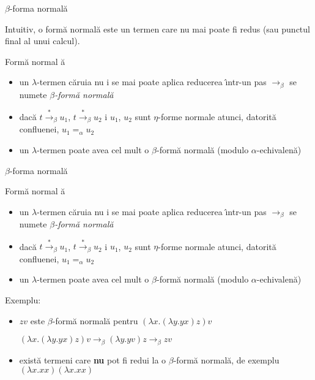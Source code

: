 \documentclass[xcolor=pdftex,romanian,colorlinks]{beamer}
\newcommand{\ra}{\rightarrow}
\newcommand{\sra}{\stackrel{*}{\rightarrow}}
\begin{document}
\begin{frame}[fragile]{$\beta$-forma normal\u a}

Intuitiv, o form\u a normal\u a este  un termen care nu mai poate fi redus (sau punctul final al unui calcul). 

\begin{block}{Form\u a normal \u a}
\begin{itemize}
\item un $\lambda$-termen c\u aruia nu i se  mai poate aplica reducerea \^{\i}ntr-un pas $\ra_\beta$  se nume\sh te {\it $\beta$-form\u a normal\u a}
\item dac\u a $t\sra_\beta u_1$, $t\sra_\beta u_2$ \sh i $u_1$, $u_2$ sunt $\eta$-forme normale atunci, datorit\u a confluen\ts ei, $u_1=_\alpha u_2$
\item un $\lambda$-termen poate avea cel mult o $\beta$-form\u a normal\u a (modulo $\alpha$-echivalen\ts \u a)
\end{itemize}
\end{block}

\end{frame}

\begin{frame}[fragile]{$\beta$-forma normal\u a}

\begin{block}{Form\u a normal \u a}
\begin{itemize}
\item un $\lambda$-termen c\u aruia nu i se  mai poate aplica reducerea \^{\i}ntr-un pas $\ra_\beta$  se nume\sh te {\it $\beta$-form\u a normal\u a}
\item dac\u a $t\sra_\beta u_1$, $t\sra_\beta u_2$ \sh i $u_1$, $u_2$ sunt $\eta$-forme normale atunci, datorit\u a confluen\ts ei, $u_1=_\alpha u_2$
\item un $\lambda$-termen poate avea cel mult o $\beta$-form\u a normal\u a (modulo $\alpha$-echivalen\ts \u a)
\end{itemize}
\end{block}

Exemplu:
\begin{itemize}
\item $zv$ este $\beta$-form\u a normal\u a pentru  $(\lambda x.(\lambda y.yx)z)v$

$(\lambda x.(\lambda y.yx)z)v\ra_\beta (\lambda y.yv)z\ra_\beta zv$

\item exist\u a termeni care {\bf nu} pot fi redu\sh i la o $\beta$-form\u a normal\u a, de exemplu $(\lambda x. xx)(\lambda x. xx)$

\end{itemize}

\end{frame}
\end{document}
